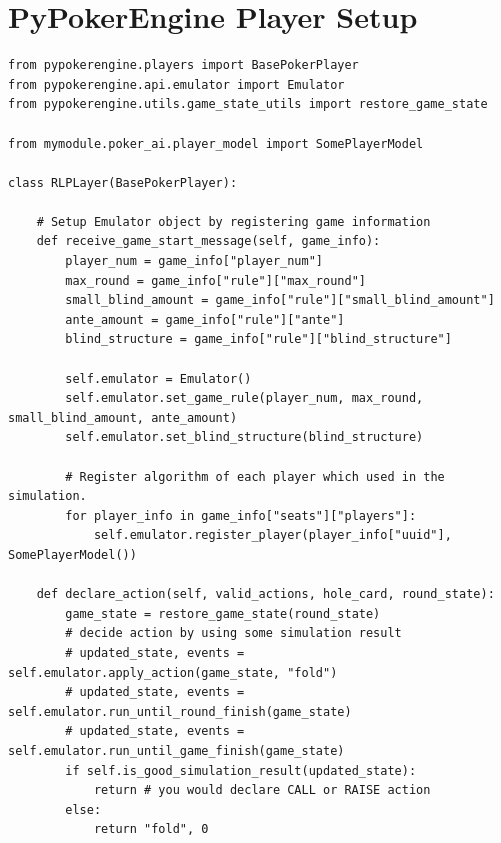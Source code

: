 \documentclass[12pt]{article}
\begin{document}
\section{PyPokerEngine Player Setup}
\label{ppe}
\begin{verbatim}
from pypokerengine.players import BasePokerPlayer
from pypokerengine.api.emulator import Emulator
from pypokerengine.utils.game_state_utils import restore_game_state

from mymodule.poker_ai.player_model import SomePlayerModel

class RLPLayer(BasePokerPlayer):

    # Setup Emulator object by registering game information
    def receive_game_start_message(self, game_info):
        player_num = game_info["player_num"]
        max_round = game_info["rule"]["max_round"]
        small_blind_amount = game_info["rule"]["small_blind_amount"]
        ante_amount = game_info["rule"]["ante"]
        blind_structure = game_info["rule"]["blind_structure"]
        
        self.emulator = Emulator()
        self.emulator.set_game_rule(player_num, max_round, small_blind_amount, ante_amount)
        self.emulator.set_blind_structure(blind_structure)
        
        # Register algorithm of each player which used in the simulation.
        for player_info in game_info["seats"]["players"]:
            self.emulator.register_player(player_info["uuid"], SomePlayerModel())

    def declare_action(self, valid_actions, hole_card, round_state):
        game_state = restore_game_state(round_state)
        # decide action by using some simulation result
        # updated_state, events = self.emulator.apply_action(game_state, "fold")
        # updated_state, events = self.emulator.run_until_round_finish(game_state)
        # updated_state, events = self.emulator.run_until_game_finish(game_state)
        if self.is_good_simulation_result(updated_state):
            return # you would declare CALL or RAISE action
        else:
            return "fold", 0
\end{verbatim}
\end{document}
